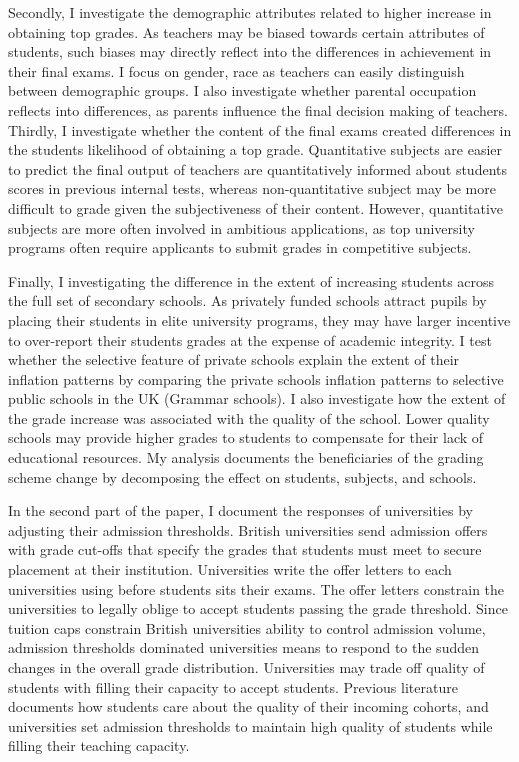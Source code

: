 Secondly, I investigate the demographic attributes related to higher increase in obtaining top grades. As teachers may be biased towards certain attributes of students, such biases may directly reflect into the differences in achievement in their final exams. I focus on gender, race as teachers can easily distinguish between demographic groups. I also investigate whether parental occupation reflects into differences, as parents influence the final decision making of teachers. Thirdly, I investigate whether the content of the final exams created differences in the students likelihood of obtaining a top grade. Quantitative subjects are easier to predict the final output of teachers are quantitatively informed about students scores in previous internal tests, whereas non-quantitative subject may be more difficult to grade given the subjectiveness of their content. However, quantitative subjects are more often involved in ambitious applications, as top university programs often require applicants to submit grades in competitive subjects.  

Finally, I investigating the difference in the extent of increasing students across the full set of secondary schools. As privately funded schools attract pupils by placing their students in elite university programs, they may have larger incentive to over-report their students grades at the expense of academic integrity. I test whether the selective feature of private schools explain the extent of their inflation patterns by comparing the private schools inflation patterns to selective public schools in the UK (Grammar schools). I also investigate how the extent of the grade increase was associated with the quality of the school. Lower quality schools may provide higher grades to students to compensate for their lack of educational resources. My analysis documents the beneficiaries of the grading scheme change by decomposing the effect on students, subjects, and schools.

In the second part of the paper, I document the responses of universities by adjusting their admission thresholds. British universities send admission offers with grade cut-offs that specify the grades that students must meet to secure placement at their institution. Universities write the offer letters to each universities using before students sits their exams. The offer letters constrain the universities to legally oblige to accept students passing the grade threshold. Since tuition caps constrain British universities ability to control admission volume, admission thresholds dominated universities means to respond to the sudden changes in the overall grade distribution. Universities may trade off quality of students with filling their capacity to accept students. Previous literature documents how students care about the quality of their incoming cohorts, and universities set admission thresholds to maintain high quality of students while filling their teaching capacity. 

